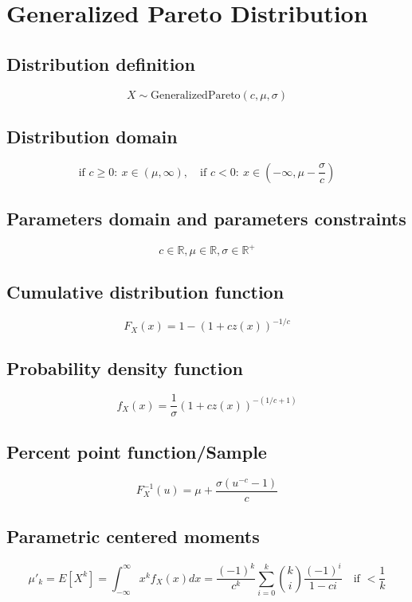 \documentclass{article}
\begin{document}
\newpage
\section{Generalized Pareto Distribution}
\subsection{Distribution definition}
\begin{equation*} X\sim\mathrm{GeneralizedPareto}\left(c,\mu,\sigma\right) \end{equation*}
\subsection{Distribution domain}
\begin{equation*} \text{if }c\geqslant 0:\ x\in\left(\mu,\infty\right),\quad \text{if }c<0:\ x\in\left(-\infty,\mu-\frac{\sigma}{c}\right) \end{equation*}
\subsection{Parameters domain and parameters constraints}
\begin{equation*} c\in\mathbb{R}, \mu\in\mathbb{R}, \sigma\in\mathbb{R}^{+} \end{equation*}
\subsection{Cumulative distribution function}
\begin{equation*} F_{X}\left(x\right)=1-(1+c z(x))^{-1/c} \end{equation*}
\subsection{Probability density function}
\begin{equation*} f_{X}\left(x\right)=\frac{1}{\sigma}(1+c z(x))^{-(1/c +1)} \end{equation*}
\subsection{Percent point function/Sample}
\begin{equation*} F^{-1}_{X}\left(u\right)=\mu+\frac{\sigma (u^{-c}-1)}{c} \end{equation*}
\subsection{Parametric centered moments}
\begin{equation*} \mu'_{k}=E[X^k]=\int_{-\infty}^{\infty}x^{k}f_{X}\left(x\right)dx=\frac{\left(-1\right)^{k}}{c^{k}}\sum_{i=0}^{k}\binom{k}{i}\frac{\left(-1\right)^{i}}{1-ci}\quad \text{if }<\frac{1}{k} \end{equation*}
\end{document}
